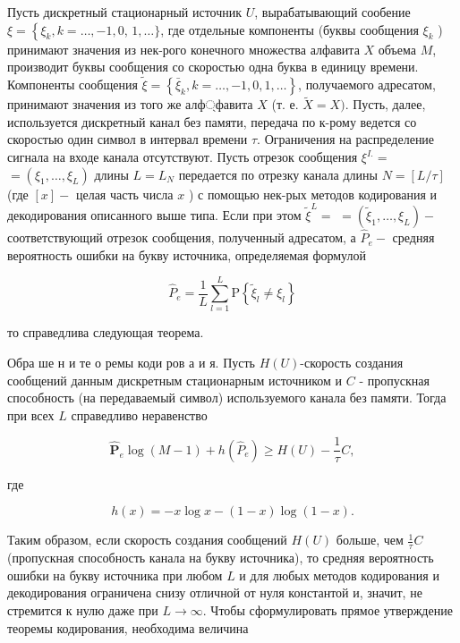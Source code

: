 \documentclass[10pt]{article}
\begin{document}
Пусть дискретный стационарный источник $U$, вырабатывающий сообение $\xi=\left\{\xi_{k}, k=\ldots,-1,0\right.$, $1, \ldots\}$, где отдельные компоненты (буквы сообщения $\xi_{k}$ ) принимают значения из нек-рого конечного множества алфавита $X$ объема $M$, производит буквы сообщения со скоростью одна буква в единицу времени. Компоненты сообщения $\tilde{\xi}=\left\{\bar{\xi}_{k}, k=\ldots,-1,0,1, \ldots\right\}$, получаемого адресатом, принимают значения из того же алф্фавита $X$ (т. е. $\tilde{X}=X)$. Пусть, далее, используется дискретный канал без памяти, передача по к-рому ведется со скоростью один символ в интервал времени $\tau$. Ограничения на распределение сигнала на входе канала отсутствуют. Пусть отрезок сообщения $\xi^{I .}=$ $=\left(\xi_{1}, \ldots, \xi_{L}\right)$ длины $L=L_{N}$ передается по отрезку канала длины $N=[L / \tau]$ (где $[x]-$ целая часть числа $x$ ) с помощью нек-рых методов кодирования и декодирования описанного выше типа. Если при этом $\tilde{\xi}^{L}=$ $=\left(\widetilde{\xi}_{1}, \ldots, \xi_{L}\right)-$ соответствующий отрезок сообщения, полученный адресатом, а $\hat{P}_{e}-$ средняя вероятность ошибки на букву источника, определяемая формулой



\[

\hat{P}_{e}=\frac{1}{L} \sum_{l=1}^{L} \mathrm{P}\left\{\tilde{\xi}_{l} \neq \xi_{l}\right\}

\]



то справедлива следующая теорема.



Обра ше н и те о ремы коди ров а и я. Пусть $H(U)$-скорость создания сообщений данным дискретным стационарным источником и $C$ - пропускная способность (на передаваемый символ) используемого канала без памяти. Тогда при всех $L$ справедливо неравенство



\[

\widehat{\boldsymbol{P}}_{e} \log (M-1)+h\left(\hat{P}_{e}\right) \geqslant H(U)-\frac{1}{\tau} C,

\]



где



\[

h(x)=-x \log x-(1-x) \log (1-x) .

\]



Таким образом, если скорость создания сообщений $H(U)$ больше, чем $\frac{1}{\tau} C$ (пропускная способность канала на букву источника), то средняя вероятность ошибки на букву источника при любом $L$ и для любых методов кодирования и декодирования ограничена снизу отличной от нуля константой и, значит, не стремится к нулю даже при $L \rightarrow \infty$. Чтобы сформулировать прямое утверждение теоремы кодирования, необходима величина
\end{document}
